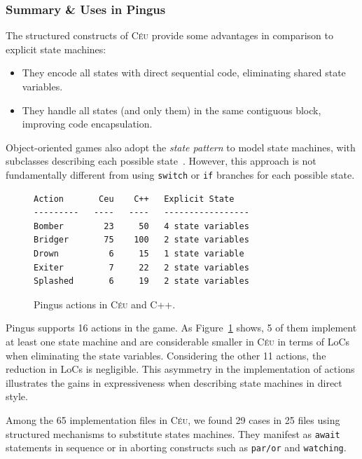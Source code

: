 \documentclass{vgtc}                          %
\newcommand{\CEU}{\textsc{C\'{e}u}\xspace}
\newcommand{\code}[1] {{\small{\texttt{#1}}}}
\begin{document}
\subsubsection{Summary \& Uses in Pingus}

The structured constructs of \CEU provide some advantages in comparison to 
explicit state machines:
%
\begin{itemize}
\item They encode all states with direct sequential code, eliminating shared
      state variables.
\item They handle all states (and only them) in the same contiguous block,
      improving code encapsulation.
\end{itemize}
%
Object-oriented games also adopt the \emph{state pattern} to model state
machines, with subclasses describing each possible state~\cite{games.patterns}.
However, this approach is not fundamentally different from using \code{switch}
or \code{if} branches for each possible state.

\begin{figure}[t]
\begin{verbatim}
Action       Ceu    C++   Explicit State
---------   ----   ----   -----------------
Bomber        23     50   4 state variables
Bridger       75    100   2 state variables
Drown          6     15   1 state variable
Exiter         7     22   2 state variables
Splashed       6     19   2 state variables
\end{verbatim}
\caption{Pingus actions in \CEU and C++.
\label{tab.actions}
}
\end{figure}

Pingus supports 16 actions in the game.
As Figure~\ref{tab.actions} shows, 5 of them implement at least one state
machine and are considerable smaller in \CEU in terms of LoCs when eliminating
the state variables.
%
Considering the other 11 actions, the reduction in LoCs is negligible.
This asymmetry in the implementation of actions illustrates the gains in
expressiveness when describing state machines in direct style.


Among the 65 implementation files in \CEU, we found 29 cases in 25 files using
structured mechanisms to substitute states machines.
They manifest as \code{await} statements in sequence or in aborting constructs
such as \code{par/or} and \code{watching}.
\end{document}
